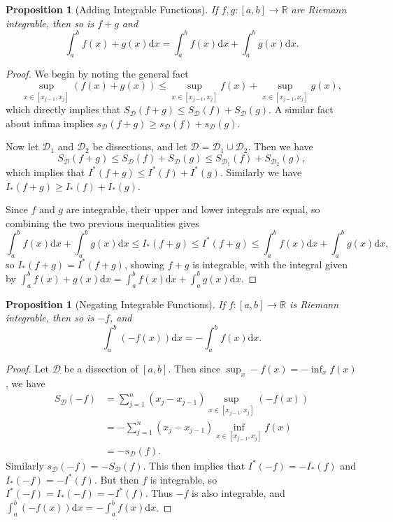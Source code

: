 \documentclass[11pt, a4paper]{article}
\newtheorem{proposition}[theorem]{Proposition}
\theoremstyle{definition}
\newcommand{\R}{\mathbb{R}}
\newcommand{\DD}{\mathcal{D}}
\newcommand{\dd}{\mathrm{d}}
\begin{document}
\begin{proposition}[Adding Integrable Functions]
	If $f, g : [a, b] \rightarrow \R$ are Riemann integrable, then so is $f + g$ and
	$$
	\int_a^b f(x) + g(x) \dd x = \int_a^b f(x) \dd x + \int_a^b g(x) \dd x.
	$$
\end{proposition}
\begin{proof}
		We begin by noting the general fact
	$$
	\sup_{x\in[x_{j - 1}, x_j]} (f(x) + g(x)) \leq \sup_{x\in[x_{j - 1}, x_j]}  f(x) + \sup_{x\in[x_{j - 1}, x_j]} g(x),
	$$
	which directly implies that $S_{\DD}(f + g) \leq S_{\DD}(f) + S_{\DD}(g)$. A similar fact about infima implies $s_{\DD}(f + g) \geq s_{\DD}(f) + s_{\DD}(g)$.

	Now let $\DD_1$ and $\DD_2$ be dissections, and let $\DD = \DD_1 \cup \DD_2$. Then we have 
		$$
		S_{\DD}(f + g) \leq S_{\DD}(f) + S_{\DD}(g) \leq S_{\DD_1}(f) + S_{\DD_2}(g),
		$$
		which implies that $I^*(f + g) \leq I^*(f) + I^*(g)$.
		Similarly we have $I_*(f + g) \geq I_*(f) + I_*(g)$.

		Since $f$ and $g$ are integrable, their upper and lower integrals are equal, so combining the two previous inequalities gives
		$$
		\int_a^b f(x) \dd x + \int_a^b g(x) \dd x \leq I_{*}(f+g) \leq I^{*}(f+g) \leq \int_a^b f(x) \dd x + \int_a^b g(x) \dd x,
		$$
		so $I_{*}(f+g) = I^{*}(f+g)$, showing $f + g$ is integrable, with the integral given by
		$
		\int_a^b f(x) + g(x) \dd x = \int_a^b f(x) \dd x + \int_a^b g(x) \dd x.
		$
\end{proof}

\begin{proposition}[Negating Integrable Functions]
	If $f:[a, b] \rightarrow \R$ is Riemann integrable, then so is $-f$, and
	$$
	\int_a^b (-f(x)) \dd x = - \int_a^b f(x) \dd x.
	$$
\end{proposition}
\begin{proof}
	Let $\DD$ be a dissection of $[a, b]$. Then since $\sup_x -f(x) = - \inf_x f(x)$, we have
	\begin{align*}
		S_{\DD} (-f) &= \sum_{j = 1}^n (x_{j} - x_{j - 1}) \sup_{x \in[x_{j - 1}, x_j]} (-f(x)) \\
		&= -\sum_{j = 1}^n (x_{j} - x_{j - 1}) \inf_{x \in[x_{j - 1}, x_j]} f(x) \\
		&= -s_\DD(f).
	\end{align*}
	Similarly $s_\DD(-f) = -S_\DD(f)$. This then implies that $I^*(-f) = -I_*(f)$ and $I_*(-f) = -I^*(f)$. But then $f$ is integrable, so $I^*(-f) = I_*(-f) = -I^*(f)$. Thus $-f$ is also integrable, and $\int_a^b (-f(x)) \dd x = - \int_a^b f(x) \dd x$.
\end{proof}
\end{document}

